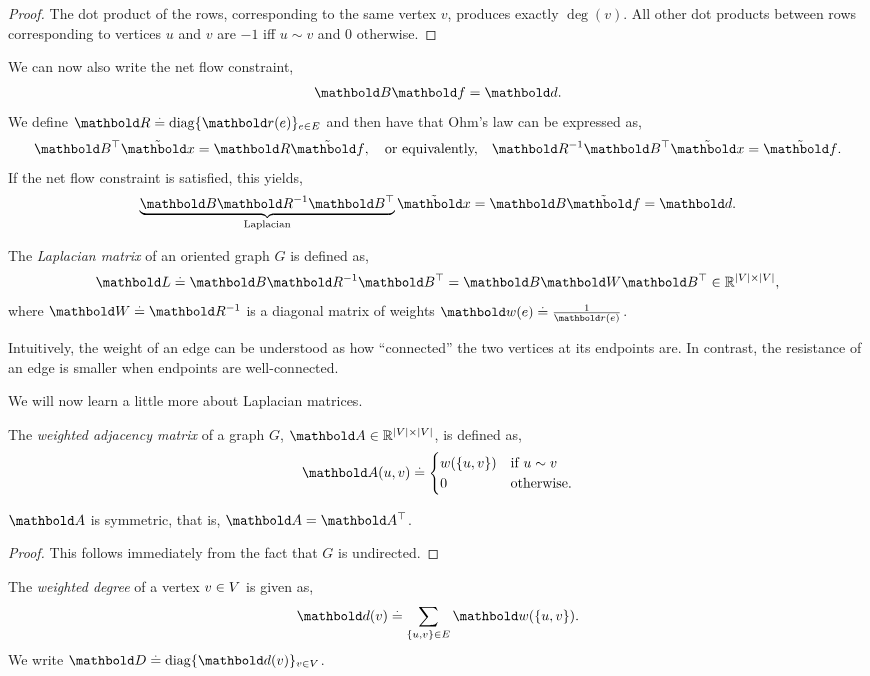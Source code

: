 \begin{proof} The dot product of the rows, corresponding to the same vertex $v$, produces exactly $\deg(v)$. All other dot products between rows corresponding to vertices $u$ and $v$ are $-1$ iff $u \sim v$ and $0$ otherwise.
\end{proof}
We can now also write the net flow constraint, \begin{align}
    \mB\vf = \vd.
\end{align} We define $\mR \defeq \diag\{\vr(e)\}_{e \in \sE}$ and then have that Ohm's law can be expressed as, \begin{align}
    \trans{\mB}\elx = \mR\ef, \quad\text{or equivalently,}\quad \mR^{-1}\trans{\mB}\elx = \ef.
\end{align} If the net flow constraint is satisfied, this yields, \begin{align}
    \underbrace{\mB\mR^{-1}\trans{\mB}}_{\text{Laplacian}}\elx = \mB\ef = \vd. \label{eq:ohms_law_and_net_flow_constraint}
\end{align}
\begin{defn}\label{defn:laplacian_matrix}
The \emph{Laplacian matrix} of an oriented graph $G$ is defined as, \begin{align}
    \mL \defeq \mB\mR^{-1}\trans{\mB} = \mB\mW\trans{\mB} \in \R^{|\sV|\times|\sV|},
\end{align} where $\mW \defeq \mR^{-1}$ is a diagonal matrix of weights $\vw(e) \defeq \frac{1}{\vr(e)}$.
\end{defn}\noindent Intuitively, the weight of an edge can be understood as how ``connected'' the two vertices at its endpoints are. In contrast, the resistance of an edge is smaller when endpoints are well-connected.

We will now learn a little more about Laplacian matrices.
\begin{defn}
The \emph{weighted adjacency matrix} of a graph $G$, $\mA \in \R^{|\sV|\times|\sV|}$, is defined as, \begin{align}
    \mA(u, v) \defeq \begin{cases}
        w(\{u,v\}) & \text{if $u \sim v$} \\
        0 & \text{otherwise}.
    \end{cases}
\end{align}
\end{defn}
\begin{lem}
$\mA$ is symmetric, that is, $\mA = \trans{\mA}$.
\end{lem}
\begin{proof}
This follows immediately from the fact that $G$ is undirected.
\end{proof}
\begin{defn}
The \emph{weighted degree} of a vertex $v \in V$ is given as, \begin{align}
    \vd(v) \defeq \sum_{\{u,v\} \in \sE} \vw(\{u,v\}).
\end{align} We write $\mD \defeq \diag\{\vd(v)\}_{v \in \sV}$.
\end{defn}

